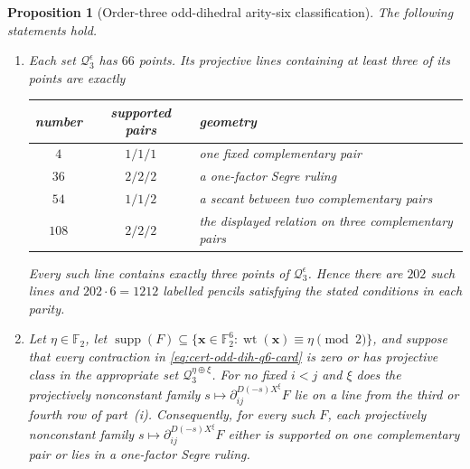 \documentclass[11pt,letterpaper,onecolumn]{article}
\theoremstyle{plain}
\newtheorem{proposition}[proposition]{Proposition}
\theoremstyle{definition}
\theoremstyle{remark}
\newcommand{\Ftwo}{\mathbb F_2}
\newcommand{\wt}{\operatorname{wt}}
\newcommand{\supp}{\operatorname{supp}}
\begin{document}
	\begin{proposition}[Order-three odd-dihedral arity-six classification]
		\label{prop:cert-odd-dih-q6-order-three}
		The following statements hold.
		
		\begin{enumerate}[label=\textnormal{(\roman*)},leftmargin=*]
			\item Each set \(\mathcal Q_3^\epsilon\) has \(66\) points.  Its projective
			lines containing at least three of its points are exactly
			\begin{center}
				\small
				\begin{tabular}{ccl}
					\toprule
					number & supported pairs & geometry\\
					\midrule
					\(4\)   & \(1/1/1\) & one fixed complementary pair\\
					\(36\)  & \(2/2/2\) & a one-factor Segre ruling\\
					\(54\)  & \(1/1/2\) & a secant between two complementary pairs\\
					\(108\) & \(2/2/2\) & the displayed relation on three complementary pairs\\
					\bottomrule
				\end{tabular}
			\end{center}
			Every such line contains exactly three points of \(\mathcal Q_3^\epsilon\).
			Hence there are \(202\) such lines and \(202\cdot6=1212\) labelled
			pencils satisfying the stated conditions in each parity.
			
			\item Let \(\eta\in\Ftwo\), let
			\(\supp(F)\subseteq\{{\mathbf x}\in\Ftwo^6:\wt({\mathbf x})\equiv\eta\pmod2\}\), and suppose that every contraction
			in \cref{eq:cert-odd-dih-q6-card} is zero or has projective class in the
			appropriate set \(\mathcal Q_3^{\eta\oplus\xi}\).  For no fixed
			\(i<j\) and \(\xi\) does the projectively nonconstant family
			\(s\mapsto \partial_{ij}^{D(-s)X^\xi}F\) lie on a line from the third or fourth row of
			part~\textnormal{(i)}.  Consequently, for every such \(F\), each projectively nonconstant
			family \(s\mapsto \partial_{ij}^{D(-s)X^\xi}F\) either is supported on one complementary pair or
			lies in a one-factor Segre ruling.
			

\end{enumerate}
\end{proposition}
\end{document}

